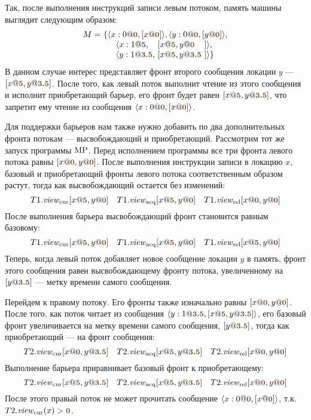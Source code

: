 Так, после выполнения инструкций записи левым потоком, память машины выглядит следующим образом:
\[\begin{array}{l@{~}l}
  M = & \{\angled{x:0@\tstamp{0}, [x@\tstamp{0}]}, \angled{y:0@\tstamp{0}, [y@\tstamp{0}]}, \\
      & \quad
        \begin{array}{l@{~}l@{~}l}
          \angled{x:1@\tstamp{5},   & [x@\tstamp{5}, y@\tstamp{0}  &]}, \\
          \angled{y:1@\tstamp{3.5}, & [x@\tstamp{5}, y@\tstamp{3.5}&]}\}
        \end{array}
\end{array}\]
В данном случае интерес представляет фронт второго сообщения локации $y$ --- $[x@\tstamp{5}, y@\tstamp{3.5}]$.
После того, как левый поток выполнит чтение из этого сообщения и исполнит приобретающий барьер,
его фронт будет равен $[x@\tstamp{5}, y@\tstamp{3.5}]$, что запретит ему чтение из сообщения
$\angled{x:0@\tstamp{0}, [x@\tstamp{0}]}$.

Для поддержки барьеров нам также нужно добавить по два дополнительных фронта потокам --- высвобождающий и приобретающий.
Рассмотрим тот же запуск программы ${\rm MP}$.
Перед исполнением программы все три фронта левого потока равны $[x@\tstamp{0}, y@\tstamp{0}]$. После выполнения
инструкции записи в локацию $x$, базовый и приобретающий фронты левого потока соответственным образом растут, тогда как
высвобождающий остается без изменений:
\[T1.\Rcur[x@\tstamp{5}, y@\tstamp{0}] \quad T1.\Racq[x@\tstamp{5}, y@\tstamp{0}] \quad T1.\Rrel[x@\tstamp{0}, y@\tstamp{0}]\]
После выполнения барьера высвобождающий фронт становится равным базовому:
\[T1.\Rcur[x@\tstamp{5}, y@\tstamp{0}] \quad T1.\Racq[x@\tstamp{5}, y@\tstamp{0}] \quad T1.\Rrel[x@\tstamp{5}, y@\tstamp{0}]\]
Теперь, когда левый поток добавляет новое сообщение локации $y$ в память, фронт этого сообщения равен высвобождающему
фронту потока, увеличенному на $[y@\tstamp{3.5}]$ --- метку времени самого сообщения.

Перейдем к правому потоку. Его фронты также изначально равны $[x@\tstamp{0}, y@\tstamp{0}]$. После того, как поток
читает из сообщения $\angled{y:1@\tstamp{3.5}, [x@\tstamp{5}, y@\tstamp{3.5}]}$, его базовый фронт увеличивается на
метку времени самого сообщения, $[y@\tstamp{3.5}]$, тогда как приобретающий --- на фронт сообщения:
\[T2.\Rcur[x@\tstamp{0}, y@\tstamp{3.5}] \quad T2.\Racq[x@\tstamp{5}, y@\tstamp{3.5}] \quad T2.\Rrel[x@\tstamp{0}, y@\tstamp{0}]\]
Выполнение барьера приравнивает базовый фронт к приобретающему:
\[T2.\Rcur[x@\tstamp{5}, y@\tstamp{3.5}] \quad T2.\Racq[x@\tstamp{5}, y@\tstamp{3.5}] \quad T2.\Rrel[x@\tstamp{0}, y@\tstamp{0}]\]
После этого правый поток не может прочитать сообщение $\angled{x:0@\tstamp{0}, [x@\tstamp{0}]}$, т.к. $T2.\Rcur(x) > \tstamp{0}$.


